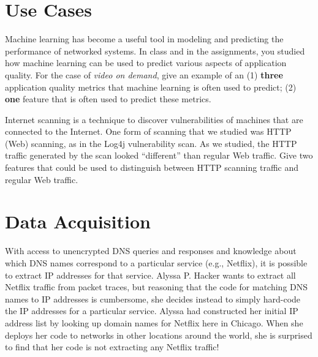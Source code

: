 \section*{Use Cases}
\vspace*{-0.1in}
 Machine learning has become a useful tool in modeling and predicting
the performance of networked systems. In class and in the assignments, you
studied how machine learning can be used to predict various aspects of
application quality. For the case of {\em video on demand}, give an example of
an (1) {\bf three} application quality metrics that machine learning is often used to
predict; (2) {\bf one} feature that is often used to predict these metrics.
\\
\eprob

 Internet scanning is a technique to discover vulnerabilities of
machines that are connected to the Internet. One form of scanning that we
studied was HTTP (Web) scanning, as in the Log4j vulnerability scan. As we
studied, the HTTP traffic generated by the scan looked ``different'' than
regular Web traffic. Give two features that could be used to distinguish
between HTTP scanning traffic and regular Web traffic.
\\
\eprob

\section*{Data Acquisition}

    With access to unencrypted DNS queries and responses and knowledge about
    which DNS names correspond to a particular service (e.g., Netflix), it is possible to extract
    IP addresses for that service.
\framebox{
\yesnoyes
}
\eprob
Alyssa P. Hacker wants to extract all Netflix traffic from packet traces, but
reasoning that the code for matching DNS names to IP addresses is cumbersome,
she decides instead to simply hard-code the IP addresses for a particular
service. Alyssa had constructed her initial IP address list by looking up
domain names for Netflix here in Chicago.  
When she deploys her code to networks in other locations around the world, she
is surprised to find that her code is not extracting any Netflix traffic!

